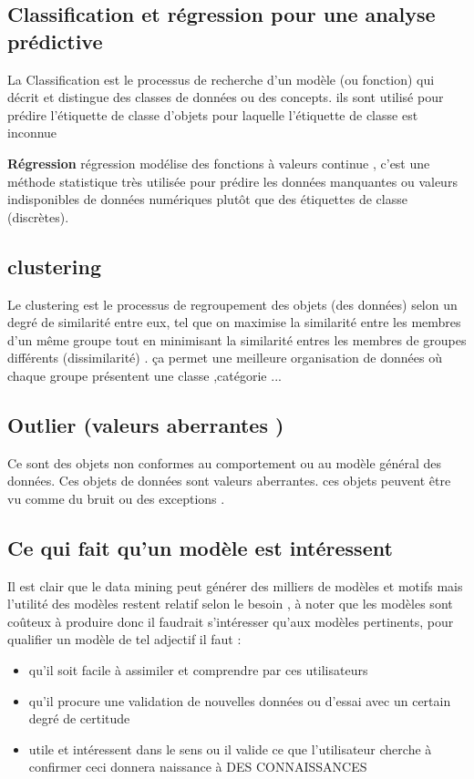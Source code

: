 \documentclass[12pt,a4paper,oneside]{book}
\begin{document}
    \subsection{Classification et régression pour une analyse prédictive}
    La Classification
    est le processus de recherche d'un
    modèle
    (ou fonction) qui décrit et distingue
   des classes de données ou des concepts.
    ils sont utilisé
    pour prédire l'étiquette de classe d'objets pour laquelle l'étiquette de classe est inconnue 
   
 \textbf{  Régression}
 régression modélise des fonctions à valeurs continue , c'est une méthode statistique  très utilisée pour prédire les données manquantes ou valeurs indisponibles de données numériques
 plutôt que des étiquettes de classe (discrètes).
 \subsection{clustering}
 Le clustering est le processus de regroupement des objets (des données) selon un degré de similarité entre eux, tel que  on maximise la similarité entre les membres d'un même groupe  tout en minimisant la similarité  entres les membres  de groupes différents (dissimilarité) . ça permet une meilleure organisation de données où chaque groupe présentent une classe ,catégorie ...
 \subsection{Outlier (valeurs aberrantes )}
Ce sont des objets non conformes au comportement ou au modèle général des données. Ces objets de données sont valeurs aberrantes. ces objets peuvent être vu comme du bruit ou des exceptions .
\subsection{Ce qui fait qu'un modèle est intéressent}
Il est clair que le data mining peut générer des milliers de modèles et motifs mais l'utilité des modèles restent relatif selon le besoin , à noter que les modèles sont coûteux à produire donc il faudrait s'intéresser qu'aux modèles pertinents, pour qualifier un modèle de tel adjectif il faut :
\begin{itemize}
\item qu'il soit facile à assimiler et comprendre par ces utilisateurs
\item qu'il procure une validation de nouvelles données ou d'essai avec un certain degré de certitude
\item utile et intéressent dans le sens ou il valide ce que l'utilisateur cherche à confirmer ceci donnera naissance à DES CONNAISSANCES
\end{itemize}
\end{document}
